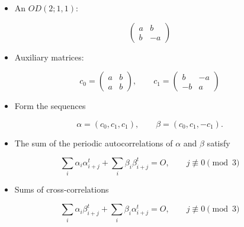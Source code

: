 \documentclass{beamer}
\begin{document}
\begin{frame}

  \begin{itemize}
    \item An $OD(2;1,1)$:
  \end{itemize}

  \[
    \begin{pmatrix}
      a & b \\ b & -a
    \end{pmatrix}
  \]

  \begin{itemize}
    \item Auxiliary matrices:
  \end{itemize}

  \[
    c_0=
    \begin{pmatrix}
      a & b \\ a & b
    \end{pmatrix}, \qquad
    c_1=
    \begin{pmatrix}
      b & -a \\ -b & a
    \end{pmatrix}
  \]
 
\end{frame}

\begin{frame}

  \begin{itemize}
    \item Form the sequences
  \end{itemize}

  $$
  \alpha = (c_0,c_1,c_1), \qquad \beta = (c_0,c_1,-c_1).
  $$

  \begin{itemize}
    \item The sum of the periodic autocorrelations of $\alpha$ and $\beta$ satisfy
  \end{itemize}

  $$
  \sum_i \alpha_i\alpha_{i+j}^t + \sum_i \beta_i\beta_{i+j}^t = O, \qquad j
  \not\equiv 0 \pmod{3}
  $$

  \begin{itemize}
    \item Sums of cross-correlations
  \end{itemize}

  $$
  \sum_i \alpha_i\beta_{i+j}^t + \sum_i \beta_i\alpha_{i+j}^t = O, \qquad j
  \not\equiv 0 \pmod{3}
  $$

\end{frame}
\end{document}
